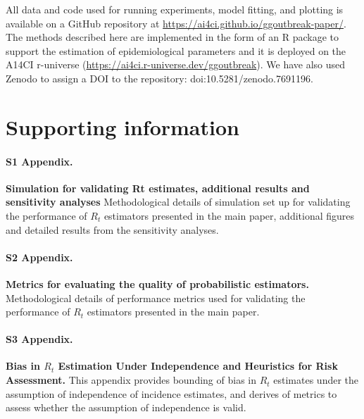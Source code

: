 \documentclass[10pt,letterpaper]{article}
\begin{document}
All data and code used for running experiments, model fitting, and plotting is available on a GitHub repository at \url{https://ai4ci.github.io/ggoutbreak-paper/}. The methods described here are implemented in the form of an R package to support the estimation of epidemiological parameters and it is deployed on the A14CI r-universe (\url{https://ai4ci.r-universe.dev/ggoutbreak}). We have also used Zenodo to assign a DOI to the repository: doi:10.5281/zenodo.7691196.

\section*{Supporting information}


\paragraph*{S1 Appendix.}
\label{S1_Appendix}
{\bf Simulation for validating Rt estimates, additional results and sensitivity analyses} Methodological details of simulation set up for validating the performance of $R_t$ estimators presented in the main paper, additional figures and detailed results from the sensitivity analyses.

\paragraph*{S2 Appendix.}
\label{S2_Appendix}
{\bf Metrics for evaluating the quality of probabilistic estimators.} Methodological details of performance metrics used for validating the performance of $R_t$ estimators presented in the main paper.

\paragraph*{S3 Appendix.}
\label{S3_Appendix}
{\bf Bias in $ R_t $ Estimation Under Independence and Heuristics for Risk Assessment.} This appendix provides bounding of bias in $R_t$ estimates under the assumption of independence of incidence estimates, and derives of metrics to assess whether the assumption of independence is valid.
\end{document}
